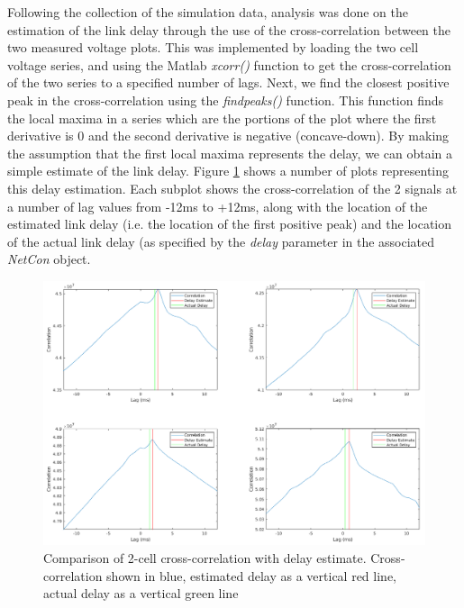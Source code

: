 Following the collection of the simulation data, analysis was done on the estimation of the link delay through the use of the cross-correlation between the two measured voltage plots. This was implemented by loading the two cell voltage series, and using the Matlab \emph{xcorr()} function to get the cross-correlation of the two series to a specified number of lags. Next, we find the closest positive peak in the cross-correlation using the \emph{findpeaks()} function. This function finds the local maxima in a series which are the portions of the plot where the first derivative is 0 and the second derivative is negative (concave-down). By making the assumption that the first local maxima represents the delay, we can obtain a simple estimate of the link delay. Figure \ref{fig:sample2CellCorrPlots} shows a number of plots representing this delay estimation. Each subplot shows the cross-correlation of the 2 signals at a number of lag values from -12ms to +12ms, along with the location of the estimated link delay (i.e. the location of the first positive peak) and the location of the actual link delay (as specified by the \emph{delay} parameter in the associated \emph{NetCon} object.\\

\begin{figure}[ht]
    \centering
    \includegraphics[width=\textwidth]{05-Results/2cell_Corr.png}
    \caption{Comparison of 2-cell cross-correlation with delay estimate. Cross-correlation shown in blue, estimated delay as a vertical red line, actual delay as a vertical green line}
    \label{fig:sample2CellCorrPlots}
\end{figure}

